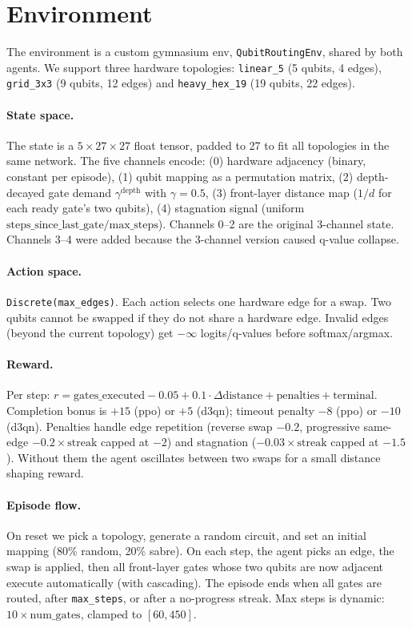 \documentclass[runningheads]{llncs}
\begin{document}
\section{Environment}

The environment is a custom gymnasium env, \texttt{QubitRoutingEnv}, shared by both agents. We support three hardware topologies: \texttt{linear\_5} (5 qubits, 4 edges), \texttt{grid\_3x3} (9 qubits, 12 edges) and \texttt{heavy\_hex\_19} (19 qubits, 22 edges).

\paragraph{State space.} The state is a $5 \times 27 \times 27$ float tensor, padded to 27 to fit all topologies in the same network. The five channels encode: (0) hardware adjacency (binary, constant per episode), (1) qubit mapping as a permutation matrix, (2) depth-decayed gate demand $\gamma^{\text{depth}}$ with $\gamma=0.5$, (3) front-layer distance map ($1/d$ for each ready gate's two qubits), (4) stagnation signal (uniform $\text{steps\_since\_last\_gate} / \text{max\_steps}$). Channels 0--2 are the original 3-channel state. Channels 3--4 were added because the 3-channel version caused q-value collapse.

\paragraph{Action space.} \texttt{Discrete(max\_edges)}. Each action selects one hardware edge for a swap. Two qubits cannot be swapped if they do not share a hardware edge. Invalid edges (beyond the current topology) get $-\infty$ logits/q-values before softmax/argmax.

\paragraph{Reward.} Per step: $r = \text{gates\_executed} - 0.05 + 0.1 \cdot \Delta\text{distance} + \text{penalties} + \text{terminal}$. Completion bonus is $+15$ (ppo) or $+5$ (d3qn); timeout penalty $-8$ (ppo) or $-10$ (d3qn). Penalties handle edge repetition (reverse swap $-0.2$, progressive same-edge $-0.2 \times \text{streak}$ capped at $-2$) and stagnation ($-0.03 \times \text{streak}$ capped at $-1.5$). Without them the agent oscillates between two swaps for a small distance shaping reward.

\paragraph{Episode flow.} On reset we pick a topology, generate a random circuit, and set an initial mapping (80\% random, 20\% sabre). On each step, the agent picks an edge, the swap is applied, then all front-layer gates whose two qubits are now adjacent execute automatically (with cascading). The episode ends when all gates are routed, after \texttt{max\_steps}, or after a no-progress streak. Max steps is dynamic: $10 \times \text{num\_gates}$, clamped to $[60, 450]$.
\end{document}
